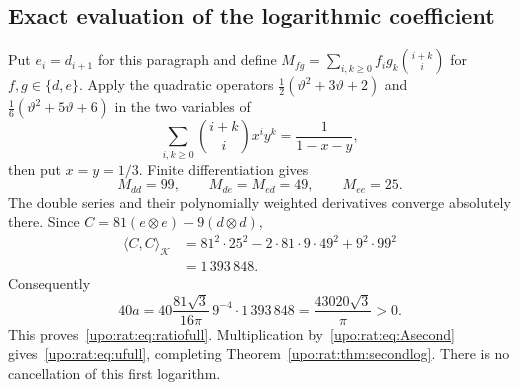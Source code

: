 \documentclass[11pt,letterpaper]{article}
\theoremstyle{remark}\newtheorem{remark}[theorem]{Remark}
\numberwithin{equation}{section}
\begin{document}
\subsection{Exact evaluation of the logarithmic coefficient}
Put $e_i=d_{i+1}$ for this paragraph and define
$M_{fg}=\sum_{i,k\ge0}f_i g_k\binom{i+k}{i}$ for $f,g\in\{d,e\}$.
Apply the quadratic operators
$\tfrac12(\vartheta^2+3\vartheta+2)$ and
$\tfrac16(\vartheta^2+5\vartheta+6)$ in the two variables of
\[
\sum_{i,k\ge0}\binom{i+k}{i}x^iy^k=\frac1{1-x-y},
\]
then put $x=y=1/3$. Finite differentiation gives
\[
M_{dd}=99,\qquad M_{de}=M_{ed}=49,\qquad M_{ee}=25.
\]
The double series and their polynomially weighted derivatives converge
absolutely there. Since $C=81(e\otimes e)-9(d\otimes d)$,
\begin{align*}
\langle C,C\rangle_{\mathcal K}
&=81^2\cdot25^2-2\cdot81\cdot9\cdot49^2+9^2\cdot99^2\\
&=1\,393\,848.
\end{align*}
Consequently
\[
40a=40\frac{81\sqrt3}{16\pi}\,9^{-4}\cdot1\,393\,848
=\frac{43020\sqrt3}{\pi}>0.
\]
This proves~\eqref{upo:rat:eq:ratiofull}. Multiplication by~\eqref{upo:rat:eq:Asecond}
gives~\eqref{upo:rat:eq:ufull}, completing Theorem~\ref{upo:rat:thm:secondlog}.
There is no cancellation of this first logarithm.
\end{document}
